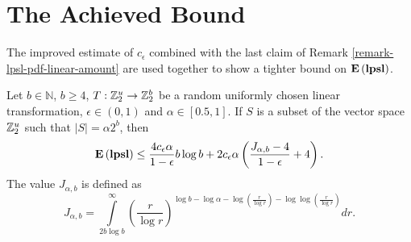 \section{The Achieved Bound}

The improved estimate of $c_\epsilon$ combined with the last claim of Remark \ref{remark-lpsl-pdf-linear-amount} are used together to show a tighter bound on $\mathbf{E}\left(\mathbf{lpsl}\right)$.

\begin{theorem}
\label{theorem-hashing-linear-amount}
Let $b \in \mathbb{N}$, $b \geq 4$, $T: \mathbb{Z}_{2}^{u} \rightarrow \mathbb{Z}_{2}^{b}$ be a random uniformly chosen linear transformation, $\epsilon \in (0, 1)$ and $\alpha \in \left[0.5, 1\right]$. If $S$ is a subset of the vector space $\mathbb{Z}_{2}^{u}$ such that $|S| = \alpha 2 ^ b$, then \[ \mathbf{E}\left(\mathbf{lpsl}\right) \leq \frac{4 c_\epsilon \alpha}{1 - \epsilon} b \log b + 2 c_\epsilon \alpha \left( \frac{J_{\alpha, b} - 4}{1 - \epsilon} + 4 \right) \text{.} \] The value $J_{\alpha, b}$ is defined as
\begin{equation}
\label{equality-j-a-b}
J_{\alpha, b} = \int\limits_{2 b \log b}^\infty \left(\frac{r}{\log r}\right)^{\log b - \log \alpha - \log \left(\frac{r}{\log r}\right) - \log \log \left(\frac{r}{\log r}\right)} dr \text{.}
\end{equation}
\end{theorem}
